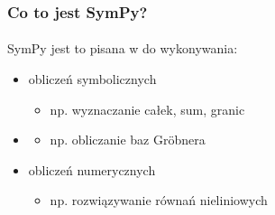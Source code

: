 \documentclass{beamer}
\begin{document}
\begin{frame}
    \frametitle{Co to jest SymPy?}
    \framesubtitle{}

    SymPy jest to  pisana w  do wykonywania:
    \begin{itemize}
        \pause
        \item obliczeń symbolicznych
            \begin{itemize}
                \item np. wyznaczanie całek, sum, granic
            \end{itemize}
        \pause
        \item {}
            \begin{itemize}
                \item np. obliczanie baz Gr\"{o}bnera
            \end{itemize}
        \pause
        \item obliczeń numerycznych
            \begin{itemize}
                \item np. rozwiązywanie równań nieliniowych
            \end{itemize}
    \end{itemize}
\end{frame}
\end{document}
